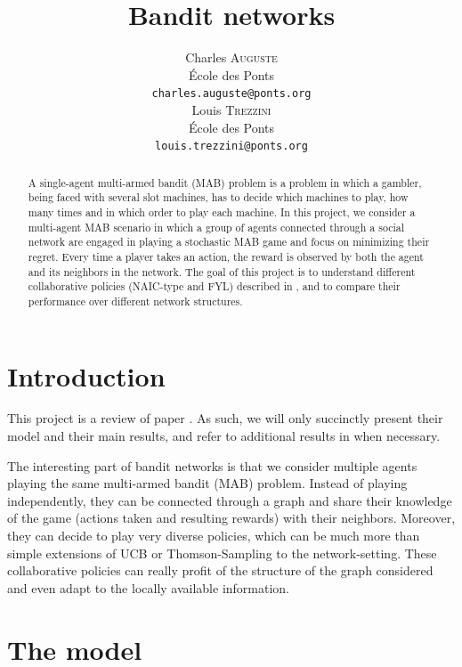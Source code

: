 \documentclass{article}
\title{Bandit networks}
\author{%
  Charles \textsc{Auguste} \\
  École des Ponts \\
  \texttt{charles.auguste@ponts.org} \\
  \And
  Louis \textsc{Trezzini} \\
  École des Ponts \\
  \texttt{louis.trezzini@ponts.org} \\
}
\begin{document}
\maketitle

\begin{abstract}
  A single-agent multi-armed bandit (MAB) problem is a problem in which a gambler, being faced with several slot machines, has to decide which machines to play, how many times and in which order to play each machine.
  In this project, we consider a multi-agent MAB scenario in which a group of agents connected through a social network are engaged in playing a stochastic MAB game and focus on minimizing their regret. Every time a player takes an action, the reward is observed by both the agent and its neighbors in the network.
  The goal of this project is to understand different collaborative policies (NAIC-type and FYL) described in \cite{DBLP:journals/corr/KollaJG16}, and to compare their performance over different network structures.
\end{abstract}

\section{Introduction}
This project is a review of paper \cite{DBLP:journals/corr/KollaJG16}. As such, we will only succinctly present their model and their main results, and refer to additional results in \cite{DBLP:journals/corr/KollaJG16} when necessary.

The interesting part of bandit networks is that we consider multiple agents playing the same multi-armed bandit (MAB) problem. Instead of playing independently, they can be connected through a graph and share their knowledge of the game (actions taken and resulting rewards) with their neighbors. Moreover, they can decide to play very diverse policies, which can be much more than simple extensions of UCB or Thomson-Sampling to the network-setting. These collaborative policies can really profit of the structure of the graph considered and even adapt to the locally available information.

\section{The model}
\end{document}

